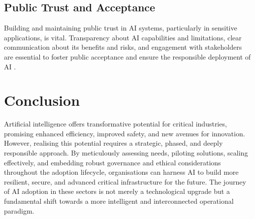 \subsection{Public Trust and Acceptance}

Building and maintaining public trust in AI systems, particularly in sensitive applications, is vital. Transparency about AI capabilities and limitations, clear communication about its benefits and risks, and engagement with stakeholders are essential to foster public acceptance and ensure the responsible deployment of AI \parencite{leyliabadi2025conceptual}.

\section{Conclusion}

Artificial intelligence offers transformative potential for critical industries, promising enhanced efficiency, improved safety, and new avenues for innovation. However, realising this potential requires a strategic, phased, and deeply responsible approach. By meticulously assessing needs, piloting solutions, scaling effectively, and embedding robust governance and ethical considerations throughout the adoption lifecycle, organisations can harness AI to build more resilient, secure, and advanced critical infrastructure for the future. The journey of AI adoption in these sectors is not merely a technological upgrade but a fundamental shift towards a more intelligent and interconnected operational paradigm.